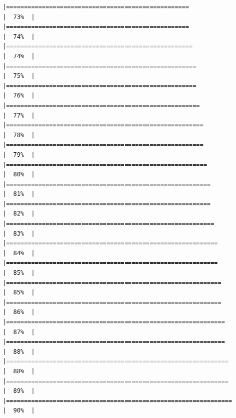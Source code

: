 \documentclass[
]{article}
\begin{document}
\begin{verbatim}
|===================================================                   |  73%  |                                                                              |===================================================                   |  74%  |                                                                              |====================================================                  |  74%  |                                                                              |=====================================================                 |  75%  |                                                                              |=====================================================                 |  76%  |                                                                              |======================================================                |  77%  |                                                                              |=======================================================               |  78%  |                                                                              |=======================================================               |  79%  |                                                                              |========================================================              |  80%  |                                                                              |=========================================================             |  81%  |                                                                              |=========================================================             |  82%  |                                                                              |==========================================================            |  83%  |                                                                              |===========================================================           |  84%  |                                                                              |===========================================================           |  85%  |                                                                              |============================================================          |  85%  |                                                                              |============================================================          |  86%  |                                                                              |=============================================================         |  87%  |                                                                              |=============================================================         |  88%  |                                                                              |==============================================================        |  88%  |                                                                              |==============================================================        |  89%  |                                                                              |===============================================================       |  90%  |                                                                              
\end{verbatim}
\end{document}

